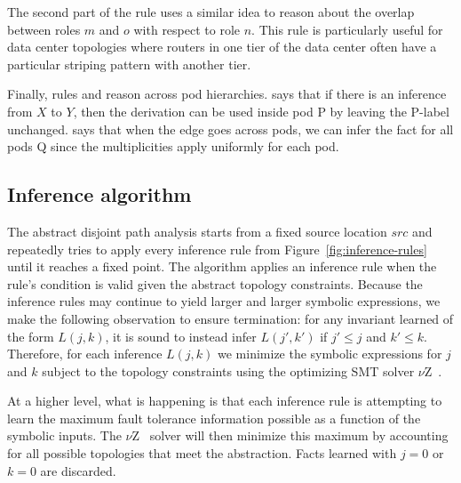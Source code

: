 \documentclass[numbers, 10pt, preprint]{sigplanconf}
\newcommand{\IE}{\emph{i.e.}}
\begin{document}
The second part of the rule uses a similar idea to reason about the overlap between roles $m$ and $o$ with respect to role $n$. This rule is particularly useful for data center topologies where routers in one tier of the data center often have a particular striping pattern with another tier.

Finally, rules  and  reason across pod hierarchies.  says that if there is an inference from $X$ to $Y$, then the derivation can be used inside pod P by leaving the P-label unchanged.  says that when the edge goes across pods, we can infer the fact for all pods Q since the multiplicities apply uniformly for each pod.


\subsection{Inference algorithm}


The abstract disjoint path analysis starts from a fixed source location $src$ and repeatedly tries to apply every inference rule from Figure~\ref{fig:inference-rules} until it reaches a fixed point. The algorithm applies an inference rule when the rule's condition is valid given the abstract topology constraints. Because the inference rules may continue to yield larger and larger symbolic expressions, we make the following observation to ensure termination: for any invariant learned of the form $L(j,k)$, it is sound to instead infer $L(j',k')$ if $j' \leq j$ and $k' \leq k$. Therefore, for each inference $L(j,k)$ we minimize the symbolic expressions for $j$ and $k$ subject to the topology constraints using the optimizing SMT solver $\nu$Z~\cite{z3opt}. 

At a higher level, what is happening is that each inference rule is attempting to learn the maximum fault tolerance information possible as a function of the symbolic inputs. The $\nu$Z~\cite{z3opt} solver will then minimize this maximum by accounting for all possible topologies that meet the abstraction. Facts learned with $j=0$ or $k=0$ are discarded.

%
%
%
\end{document}
